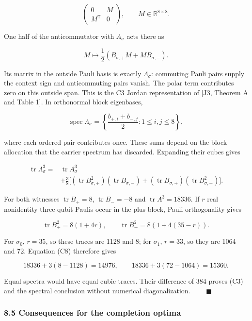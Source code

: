 \documentclass[11pt,a4paper]{article}
\begin{document}
\[\begin{pmatrix}0&M\\M^{\mathsf T}&0\end{pmatrix},\qquad M\in\mathbb R^{8\times8}.\]

One half of the anticommutator with \(A_\sigma\) acts there as

\[M\longmapsto\frac12(B_{\sigma,+}M+MB_{\sigma,-}).
\tag{C6}\]

Its matrix in the outside Pauli basis is exactly \(\Lambda_\sigma\): commuting Pauli pairs supply the
context sign and anticommuting pairs vanish. The polar term contributes zero on this outside span.
This is the C3 Jordan representation of {[}J3, Theorem A and Table 1{]}. In orthonormal block eigenbases,

\[\operatorname{spec}\Lambda_\sigma=
\left\{\frac{b_{+,i}+b_{-,j}}2:1\le i,j\le8\right\},
\tag{C7}\]

where each ordered pair contributes once. These sums depend on the block allocation that the carrier
spectrum has discarded. Expanding their cubes gives

\[\begin{aligned}
\operatorname{tr}\Lambda_\sigma^3={}&\operatorname{tr}A_\sigma^3\\ &+\frac38\bigl[
(\operatorname{tr}B_{\sigma,+}^2)(\operatorname{tr}B_{\sigma,-})
+(\operatorname{tr}B_{\sigma,+})(\operatorname{tr}B_{\sigma,-}^2)
\bigr].
\end{aligned}
\tag{C8}\]

For both witnesses \(\operatorname{tr}B_+=8\), \(\operatorname{tr}B_-=-8\) and
\(\operatorname{tr}A^3=18336\). If \(r\) real nonidentity three-qubit Paulis occur in the plus block,
Pauli orthogonality gives

\[\operatorname{tr}B_+^2=8(1+4r),\qquad
\operatorname{tr}B_-^2=8(1+4(35-r)).
\tag{C9}\]

For \(\sigma_0\), \(r=35\), so these traces are 1128 and 8; for \(\sigma_1\), \(r=33\), so they are 1064 and
72. Equation (C8) therefore gives

\[18336+3(8-1128)=14976,\qquad
18336+3(72-1064)=15360.\]

Equal spectra would have equal cubic traces. Their difference of 384 proves (C3) and the spectral
conclusion without numerical diagonalization. \(\qquad\blacksquare\)

\subsubsection{8.5 Consequences for the completion optima}\label{85-consequences-for-the-completion-optima}
\end{document}
